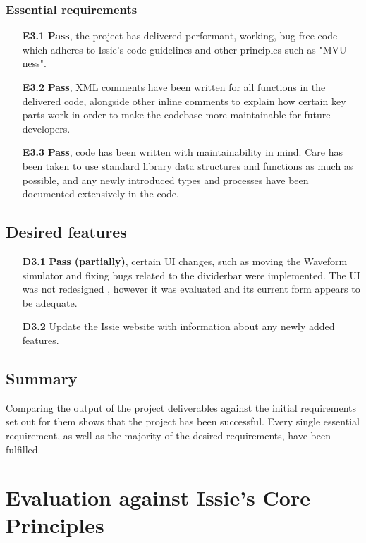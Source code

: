 \subsubsection*{Essential requirements}
\begin{itemize}
    \item[\textbf{E3.1}]\textbf{Pass}, the project has delivered performant, working, bug-free code which adheres to Issie's code guidelines and other principles such as "MVU-ness".
    \medskip
    \item[\textbf{E3.2}] \textbf{Pass}, XML comments have been written for all functions in the delivered code, alongside other inline comments to explain how certain key parts work in order to make the codebase more maintainable for future developers.
    \medskip
    \item[\textbf{E3.3}] \textbf{Pass}, code has been written with maintainability in mind. Care has been taken to use standard library data structures and functions as much as possible, and any newly introduced types and processes have been documented extensively in the code.
\end{itemize}

\subsection*{Desired features}
\begin{itemize}
    \item[\textbf{D3.1}] \textbf{Pass (partially)}, certain UI changes, such as moving the Waveform simulator and fixing bugs related to the dividerbar were implemented. The UI was not redesigned , however it was evaluated and its current form appears to be adequate.
    \medskip
    \item[\textbf{D3.2}] Update the Issie website with information about any newly added features.
\end{itemize}

\subsection{Summary}
Comparing the output of the project deliverables against the initial requirements set out for them shows that the project has been successful. Every single essential requirement, as well as the majority of the desired requirements, have been fulfilled.

\section{Evaluation against Issie's Core Principles}

